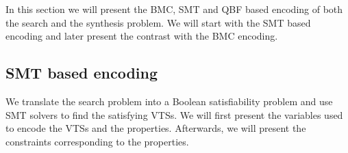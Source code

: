 %
%
%

In this section we will present the BMC, SMT and QBF based encoding of both the search and the synthesis problem. We will start with the SMT based encoding and later present the contrast with the BMC encoding.

\subsection{SMT based encoding}
\label{enc:smt}


We translate the search problem into a Boolean satisfiability
problem and use SMT solvers to find the satisfying VTSs.
%
We will first present the variables used to encode the
VTSs and the properties.
%
Afterwards, we will present the constraints corresponding to the
properties.

